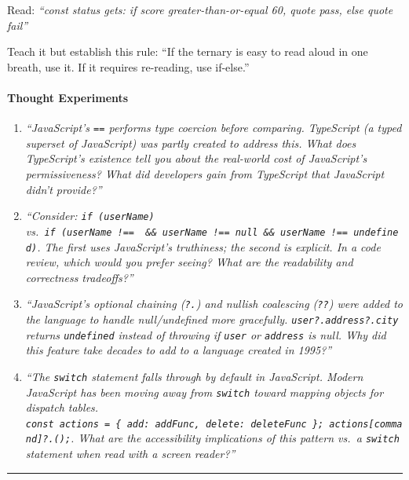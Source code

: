 \documentclass[
  justified,
  openright,
]{tufte-book}
\let\paragraph\paragraph
\let\paragraph\paragraph
\begin{document}
Read: \emph{``const status gets: if score greater-than-or-equal 60,
quote pass, else quote fail''}

Teach it but establish this rule: ``If the ternary is easy to read aloud
in one breath, use it. If it requires re-reading, use if-else.''

\paragraph{Thought Experiments}\label{thought-experiments-21}

\begin{enumerate}
\def\labelenumi{\arabic{enumi}.}
\item
  \emph{``JavaScript's \texttt{==} performs type coercion before
  comparing. TypeScript (a typed superset of JavaScript) was partly
  created to address this. What does TypeScript's existence tell you
  about the real-world cost of JavaScript's permissiveness? What did
  developers gain from TypeScript that JavaScript didn't provide?''}
\item
  \emph{``Consider: \texttt{if\ (userName)}
  vs.~\texttt{if\ (userName\ !==\ \textquotesingle{}\textquotesingle{}\ \&\&\ userName\ !==\ null\ \&\&\ userName\ !==\ undefined)}.
  The first uses JavaScript's truthiness; the second is explicit. In a
  code review, which would you prefer seeing? What are the readability
  and correctness tradeoffs?''}
\item
  \emph{``JavaScript's optional chaining (\texttt{?.}) and nullish
  coalescing (\texttt{??}) were added to the language to handle
  null/undefined more gracefully. \texttt{user?.address?.city} returns
  \texttt{undefined} instead of throwing if \texttt{user} or
  \texttt{address} is null. Why did this feature take decades to add to
  a language created in 1995?''}
\item
  \emph{``The \texttt{switch} statement falls through by default in
  JavaScript. Modern JavaScript has been moving away from
  \texttt{switch} toward mapping objects for dispatch tables.
  \texttt{const\ actions\ =\ \{\ \textquotesingle{}add\textquotesingle{}:\ addFunc,\ \textquotesingle{}delete\textquotesingle{}:\ deleteFunc\ \};\ actions{[}command{]}?.();}.
  What are the accessibility implications of this pattern vs.~a
  \texttt{switch} statement when read with a screen reader?''}
\end{enumerate}

\begin{center}\rule{0.5\linewidth}{0.5pt}\end{center}
\end{document}
